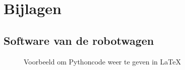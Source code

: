 \section{Bijlagen}

\subsection{Software van de robotwagen}
\begin{figure}[h]
    
    \caption{Voorbeeld om Pythoncode weer te geven in \LaTeX}
\end{figure}